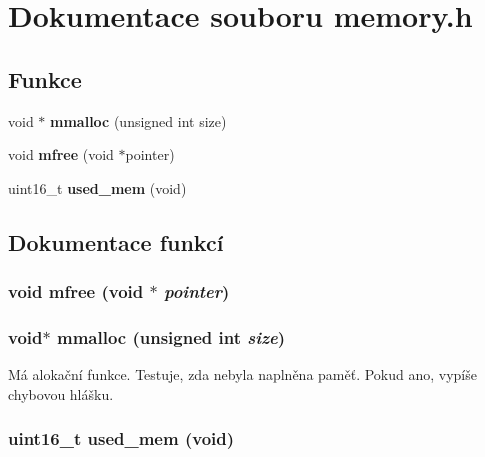 \section{Dokumentace souboru memory.h}
\label{memory_8h}
\subsection*{Funkce}
\begin{DoxyCompactItemize}
\item 
void $\ast$ {\bf mmalloc} (unsigned int size)
\item 
void {\bf mfree} (void $\ast$pointer)
\item 
uint16\_\-t {\bf used\_\-mem} (void)
\end{DoxyCompactItemize}


\subsection{Dokumentace funkcí}
\subsubsection[{mfree}]{\setlength{\rightskip}{0pt plus 5cm}void mfree (void $\ast$ {\em pointer})}\label{memory_8h_a9ba414662a250ef92d4296a19dafad43}
\subsubsection[{mmalloc}]{\setlength{\rightskip}{0pt plus 5cm}void$\ast$ mmalloc (unsigned int {\em size})}\label{memory_8h_ac1847e839d655a069b4c77d164f395c5}
Má alokační funkce. Testuje, zda nebyla naplněna paměť. Pokud ano, vypíše chybovou hlášku. 
\subsubsection[{used\_\-mem}]{\setlength{\rightskip}{0pt plus 5cm}uint16\_\-t used\_\-mem (void)}\label{memory_8h_a8dae36488b9df941d0d6734093c03c1f}
